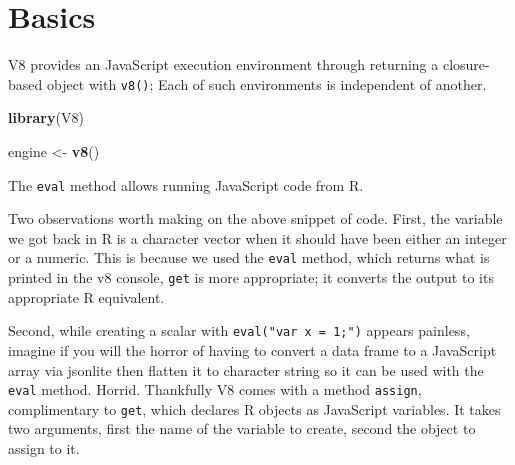 \documentclass[10pt,]{krantz}
\makeatletter
\newenvironment{Shaded}{\begin{snugshade}}{\end{snugshade}}
\newcommand{\CommentTok}[1]{\textcolor[rgb]{0.37,0.37,0.37}{\textit{#1}}}
\newcommand{\KeywordTok}[1]{\textcolor[rgb]{0.27,0.27,0.27}{\textbf{#1}}}
\newcommand{\NormalTok}[1]{#1}
\newcommand{\OperatorTok}[1]{\textcolor[rgb]{0.43,0.43,0.43}{\textbf{#1}}}
\newcommand{\StringTok}[1]{\textcolor[rgb]{0.5,0.5,0.5}{#1}}
\newenvironment{kframe}{%
\medskip{}
\setlength{\fboxsep}{.8em}
 \def\at@end@of@kframe{}%
 \ifinner\ifhmode%
  \def\at@end@of@kframe{\end{minipage}}%
  \begin{minipage}{\columnwidth}%
 \fi\fi%
 \def\FrameCommand##1{\hskip\@totalleftmargin \hskip-\fboxsep
 \colorbox{shadecolor}{##1}\hskip-\fboxsep
     \hskip-\linewidth \hskip-\@totalleftmargin \hskip\columnwidth}%
 \MakeFramed {\advance\hsize-\width
   \@totalleftmargin\z@ \linewidth\hsize
   \@setminipage}}%
 {\par\unskip\endMakeFramed%
 \at@end@of@kframe}
\renewenvironment{Shaded}{\begin{kframe}}{\end{kframe}}
\makeatother
\begin{document}
\hypertarget{v8-basics}{%
\section{Basics}\label{v8-basics}}

V8 provides an JavaScript execution environment through returning a closure-based object with \texttt{v8()}; Each of such environments is independent of another.

\begin{Shaded}
\begin{Highlighting}[]
\KeywordTok{library}\NormalTok{(V8)}

\NormalTok{engine <-}\StringTok{ }\KeywordTok{v8}\NormalTok{()}
\end{Highlighting}
\end{Shaded}

The \texttt{eval} method allows running JavaScript code from R.

\begin{Shaded}
\end{Shaded}

Two observations worth making on the above snippet of code. First, the variable we got back in R is a character vector when it should have been either an integer or a numeric. This is because we used the \texttt{eval} method, which returns what is printed in the v8 console, \texttt{get} is more appropriate; it converts the output to its appropriate R equivalent.

\begin{Shaded}
\end{Shaded}

Second, while creating a scalar with \texttt{eval("var\ x\ =\ 1;")} appears painless, imagine if you will the horror of having to convert a data frame to a JavaScript array via jsonlite then flatten it to character string so it can be used with the \texttt{eval} method. Horrid. Thankfully V8 comes with a method \texttt{assign}, complimentary to \texttt{get}, which declares R objects as JavaScript variables. It takes two arguments, first the name of the variable to create, second the object to assign to it.
\end{document}
